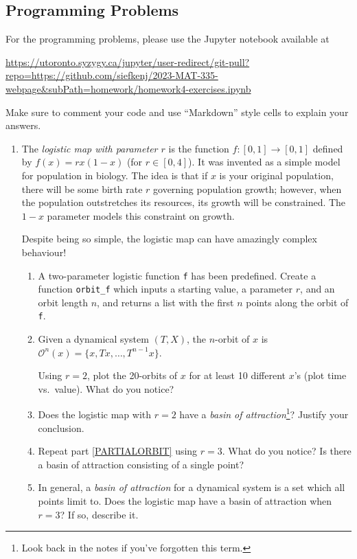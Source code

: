 \documentclass[letter]{article}
\begin{document}
	\subsection*{Programming Problems}
	For the programming problems, please use the Jupyter notebook available at

	\url{https://utoronto.syzygy.ca/jupyter/user-redirect/git-pull?repo=https://github.com/siefkenj/2023-MAT-335-webpage&subPath=homework/homework4-exercises.ipynb}

	Make sure to comment your code and use ``Markdown'' style cells to explain your answers.

	\begin{enumerate}
		\item The \emph{logistic map with parameter $r$} is the function $f\colon [0,1]\to[0,1]$ defined by $f(x)=rx(1-x)$ (for $r\in[0,4]$).
			It was invented as a simple model for population in biology. The idea is that if $x$ is your original population,
			there will be some birth rate $r$ governing population growth; however, when the population outstretches its
			resources, its growth will be constrained. The $1-x$ parameter models this constraint on growth.

			Despite being so simple, the logistic map can have amazingly complex behaviour!

		\begin{enumerate}
			\item A two-parameter logistic function {\tt f} has been predefined. Create a function \verb|orbit_f| which inputs
				a starting value, a parameter $r$, and an orbit length $n$, and returns a list with the first
				$n$ points along the orbit of {\tt f}.

			\item \label{PARTIALORBIT}Given a dynamical system $(T,X)$, the $n$-orbit of $x$ is $\mathcal O^n(x)=\{x,Tx,\ldots, T^{n-1}x\}$.

				Using $r=2$, plot the 20-orbits of $x$ for at least 10 different $x$'s (plot time vs.~value). What do you notice?
			\item Does the logistic map with $r=2$ have a \emph{basin of attraction}\footnote{ Look back in the notes
				if you've forgotten this term.}? Justify your conclusion.
			\item Repeat part \ref{PARTIALORBIT} using $r=3$. What do you notice? Is there a basin of attraction consisting of a single point?

			\item In general, a \emph{basin of attraction} for a dynamical system is a set which all points limit to.
				Does the logistic map have a basin of attraction when $r=3$? If so, describe it.


\end{enumerate}
\end{enumerate}
\end{document}
